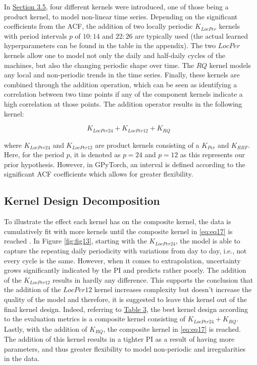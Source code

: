 In \hyperlink{subsection.3.5}{Section 3.5}, four different kernels were introduced, one of those being a product kernel, to model non-linear time series. Depending on the significant coefficients from the ACF, the addition of two locally periodic $K_{LocPer}$ kernels with period intervals $p$ of $10:14$ and $22:26$ are typically used (the actual learned hyperparameters can be found in the table in the appendix). The two $LocPer$ kernels allow one to model not only the daily and half-daily cycles of the machines, but also the changing periodic shape over time. The $RQ$ kernel models any local and non-periodic trends in the time series. Finally, these kernels are combined through the addition operation, which can be seen as identifying a correlation between two time points if any of the component kernels indicate a high correlation at those points. The addition operator results in the following kernel:

\begin{equation}
    K_{LocPer24} + K_{LocPer12} + K_{RQ}
\label{eq:eq17}
\end{equation}

where $K_{LocPer24}$  and $K_{LocPer12}$ are product kernels consisting of a $K_{Per}$ and $K_{RBF}$. Here, for the period $p$, it is denoted as $p = 24$ and $p = 12$ as this represents our prior hypothesis. However, in GPyTorch, an interval is defined according to the significant ACF coefficients which allows for greater flexibility.    

\subsection{Kernel Design Decomposition}

To illustrate the effect each kernel has on the composite kernel, the data is cumulatively fit with more kernels until the composite kernel in \ref{eq:eq17} is reached \cite{gp_prices}. In Figure \ref{fig:fig13}, starting with the $K_{LocPer24}$, the model is able to capture the repeating daily periodicity with variations from day to day, i.e., not every cycle is the same. However, when it comes to extrapolation, uncertainty grows significantly indicated by the PI and predicts rather poorly. The addition of the $K_{LocPer12}$ results in hardly any difference. This supports the conclusion that the addition of the $LocPer12$ kernel increases complexity but doesn't increase the quality of the model and therefore, it is suggested to leave this kernel out of the final kernel design. Indeed, referring to \hyperlink{table.3}{Table 3}, the best kernel design according to the evaluation metrics is a composite kernel consisting of $K_{LocPer24} + K_{RQ}$. Lastly, with the addition of $K_{RQ}$, the composite kernel in \ref{eq:eq17} is reached. The addition of this kernel results in a tighter PI as a result of having more parameters, and thus greater flexibility to model non-periodic and irregularities in the data.

